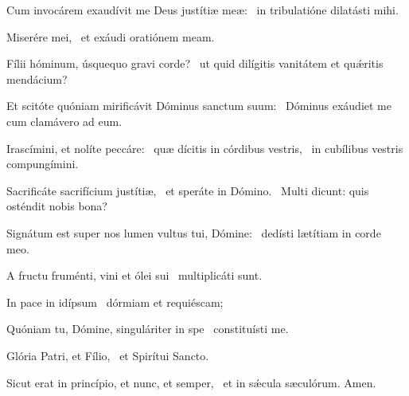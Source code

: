 \item Cum invocárem exaudívit me Deus justítiæ meæ:~\psstar{} in tribulatióne dilatásti mihi.

\item Miserére mei,~\psstar{} et exáudi oratiónem meam.

\item Fílii hóminum, úsquequo gravi corde?~\psstar{} ut quid dilígitis vanitátem et quǽritis mendácium?

\item Et scitóte quóniam mirificávit Dóminus sanctum suum:~\psstar{} Dóminus exáudiet me cum clamávero ad eum.

\item Irascímini, et nolíte peccáre:~\pscross{} quæ dícitis in córdibus vestris,~\psstar{} in cubílibus vestris compungímini.

\item Sacrificáte sacrifícium justítiæ,~\pscross{} et speráte in Dómino.~\psstar{} Multi dicunt: quis osténdit nobis bona?

\item Signátum est super nos lumen vultus tui, Dómine:~\psstar{} dedísti lætítiam in corde meo.

\item A fructu fruménti, vini et ólei sui~\psstar{} multiplicáti sunt.

\item In pace in idípsum~\psstar{} dórmiam et requiéscam;

\item Quóniam tu, Dómine, singuláriter in spe~\psstar{} constituísti me.

\item Glória Patri, et Fílio,~\psstar{} et Spirítui Sancto.

\item Sicut erat in princípio, et nunc, et semper,~\psstar{} et in sǽcula sæculórum. Amen.
